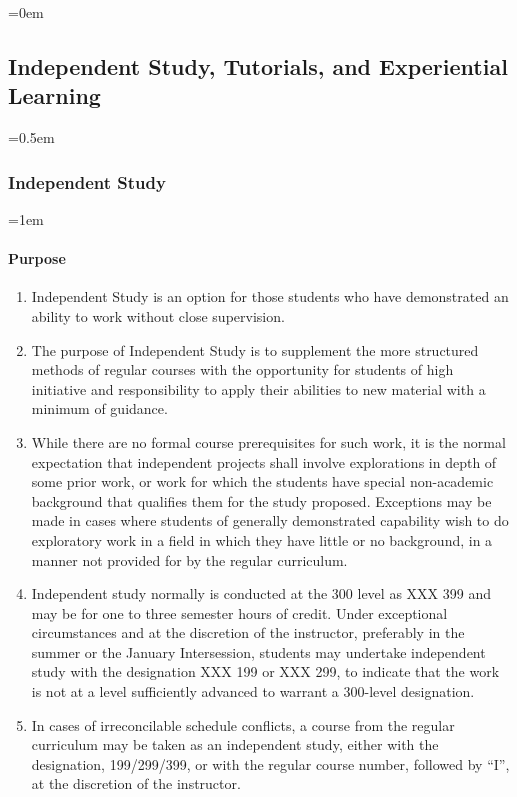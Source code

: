 \documentclass{manual}
\newcommand{\modified}[1]{}
\newcommand{\oldbreak}[1]{}
\let\oldsubsection\subsection
\renewcommand\subsection{\leftskip=0em\oldsubsection}
\let\oldsubsubsection\subsubsection
\renewcommand\subsubsection{\leftskip=0.5em\oldsubsubsection}
\let\oldparagraph\paragraph
\renewcommand\paragraph{\leftskip=1em\oldparagraph}
\newcommand{\itemLevelA}{\alph*.}
\newcommand{\itemRefA}{\alph*}
\begin{document}
\oldbreak{V-6}

\subsection{Independent Study, Tutorials, and Experiential Learning}\label{sec:IndependentStudyAndTutorials}

\subsubsection{Independent Study}

\paragraph{Purpose}

\begin{enumerate}[label=\itemLevelA,ref=\itemRefA]
\item Independent Study is an option for those students who have demonstrated an ability to\modified{5/13/93} work without close supervision. 

\item The purpose of Independent Study is to supplement the more structured methods of regular courses with the opportunity for students of high initiative and responsibility to apply their abilities to new material with a minimum of guidance. 

\item While there are no formal course prerequisites for such work, it is the normal expectation that independent projects shall involve explorations in depth of some prior work, or work for which the students have special non-academic background that qualifies them\modified{10/10/89} for the study proposed. Exceptions may be made in cases where students of generally demonstrated capability wish to do exploratory work in a field in which they have little or no background, in a manner not provided for by the regular curriculum. 

\item Independent\modified{5/12/98} study normally is conducted at the 300 level as XXX 399 and may be for one to three semester hours of credit. Under exceptional circumstances and at the discretion of the instructor, preferably in the summer or the January Intersession, students may undertake independent study with the designation XXX 199 or XXX 299, to indicate that the work is not at a level sufficiently advanced to warrant a 300-level designation.

\item In cases of irreconcilable schedule conflicts, a course from the regular curriculum may be taken as an independent study, either with the designation, 199/299/399, or with the regular course number, followed by ``I'', at the discretion of the instructor.
\end{enumerate}
\end{document}
